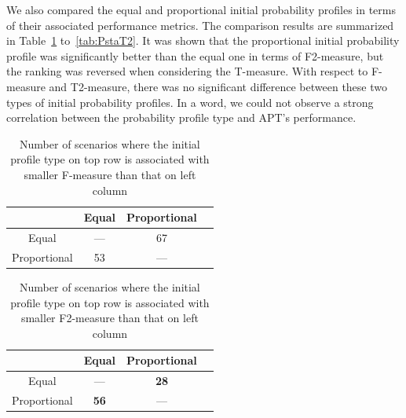 \documentclass[10pt,journal,compsoc]{IEEEtran}
\begin{document}
We also compared the equal and proportional initial probability profiles in terms of their associated performance metrics. The comparison results are summarized in Table~\ref{tab:PstaF} to~\ref{tab:PstaT2}. It was shown that the proportional initial probability profile was significantly better than the equal one in terms of F2-measure, but the ranking was reversed when considering the T-measure. With respect to F-measure and T2-measure, there was no significant difference between these two types of initial probability profiles. In a word, we could not observe a strong correlation between the probability profile type and APT's performance.


\begin{table}
\caption{Number of scenarios where the initial profile type on top row is associated with smaller F-measure than that on left column}
\label{tab:PstaF}
\centering
\begin{tabular}{|c|c|c|c|} \hline
							& Equal				& Proportional	\\ \hline
Equal					& ---					& 67						\\ \hline
Proportional	& 53					& ---						\\ \hline
\end{tabular}
\end{table}

\begin{table}
\caption{Number of scenarios where the initial profile type on top row is associated with smaller F2-measure than that on left column}
\label{tab:PstaF2}
\centering
\begin{tabular}{|c|c|c|c|} \hline
							& Equal				& Proportional	\\ \hline
Equal					& ---					& \textbf{28}		\\ \hline
Proportional	& \textbf{56}	& ---						\\ \hline
\end{tabular}
\end{table}
\end{document}
